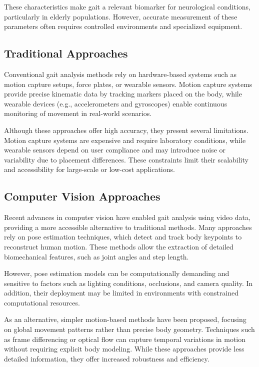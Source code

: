 \documentclass[12pt,a4paper]{article} %
\begin{document}
These characteristics make gait a relevant biomarker for neurological conditions, particularly in elderly populations. However, accurate measurement of these parameters often requires controlled environments and specialized equipment.

\subsection{Traditional Approaches}
Conventional gait analysis methods rely on hardware-based systems such as motion capture setups, force plates, or wearable sensors. Motion capture systems provide precise kinematic data by tracking markers placed on the body, while wearable devices (e.g., accelerometers and gyroscopes) enable continuous monitoring of movement in real-world scenarios.

Although these approaches offer high accuracy, they present several limitations. Motion capture systems are expensive and require laboratory conditions, while wearable sensors depend on user compliance and may introduce noise or variability due to placement differences. These constraints limit their scalability and accessibility for large-scale or low-cost applications.

\subsection{Computer Vision Approaches}
Recent advances in computer vision have enabled gait analysis using video data, providing a more accessible alternative to traditional methods. Many approaches rely on pose estimation techniques, which detect and track body keypoints to reconstruct human motion. These methods allow the extraction of detailed biomechanical features, such as joint angles and step length.

However, pose estimation models can be computationally demanding and sensitive to factors such as lighting conditions, occlusions, and camera quality. In addition, their deployment may be limited in environments with constrained computational resources.

As an alternative, simpler motion-based methods have been proposed, focusing on global movement patterns rather than precise body geometry. Techniques such as frame differencing or optical flow can capture temporal variations in motion without requiring explicit body modeling. While these approaches provide less detailed information, they offer increased robustness and efficiency.
\end{document}
